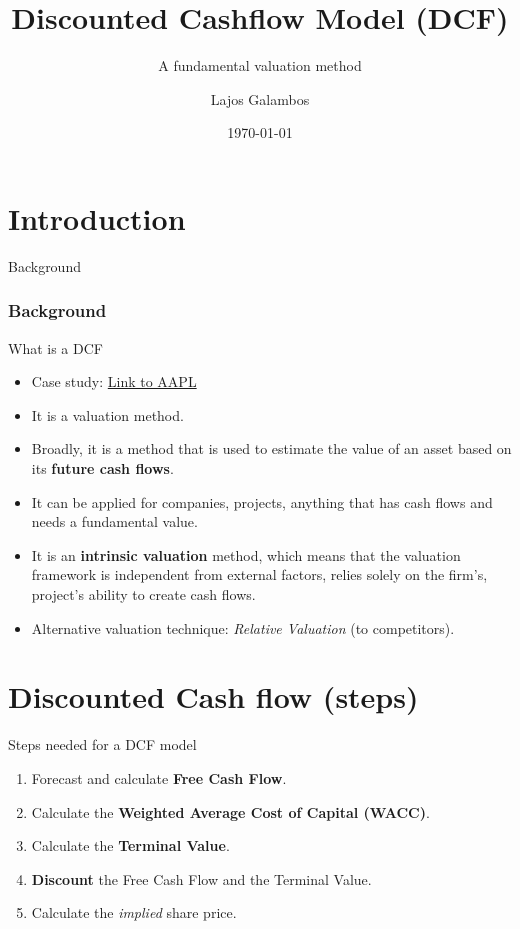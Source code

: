 \documentclass[serif, aspectratio=169]{beamer}
\author{Lajos Galambos}
\title{Discounted Cashflow Model (DCF)}
\subtitle{A fundamental valuation method}
\date{\small \today}
\begin{document}
\begin{frame}
    \titlepage
    \vspace*{-0.6cm}
\end{frame}

\begin{frame}    
\tableofcontents[sectionstyle=show,
subsectionstyle=show/shaded/hide,
subsubsectionstyle=show/shaded/hide]
\end{frame}


\section{Introduction}
\begin{frame}{Background}
	\frametitle<presentation>{Background}
	\begin{block}{What is a DCF}
		\begin{itemize}
           \item Case study: \href{https://github.com/galamboslajos/Finance-Working-Files/blob/main/DCF_AAPL.ipynb}{Link to AAPL}
			\item It is a valuation method.
			\item Broadly, it is a method that is used to estimate the value of an asset based on its \textbf{future cash flows}.
			\item It can be applied for companies, projects, anything that has cash flows and needs a fundamental value.
   \item It is an \textbf{intrinsic valuation} method, which means that the valuation framework is independent from external factors, relies solely on the firm's, project's ability to create cash flows. 
   \item Alternative valuation technique: \textit{Relative Valuation} (to competitors).
		\end{itemize}
	\end{block}
	
\end{frame}

\section{Discounted Cash flow (steps)}
\begin{frame}{Steps needed for a DCF model}
	\begin{enumerate}
			\item Forecast and calculate \textbf{Free Cash Flow}.
			\item Calculate the \textbf{Weighted Average Cost of Capital (WACC)}.
			\item Calculate the \textbf{Terminal Value}.
            \item \textbf{Discount} the Free Cash Flow and the Terminal Value. 
            \item Calculate the \textit{implied} share price.
		\end{enumerate}
	
\end{frame}
\end{document}
